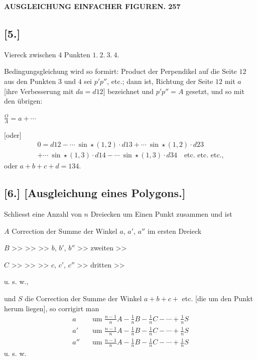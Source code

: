 \documentclass[12pt,a4paper]{article}
\theoremstyle{plain}
\theoremstyle{definition}
\theoremstyle{remark}
\begin{document}
\newpage

\noindent\textbf{AUSGLEICHUNG EINFACHER FIGUREN. 257}

\subsection*{[5.]}

Viereck zwischen 4 Punkten $1.\ 2.\ 3.\ 4$.

Bedingungsgleichung wird so formirt: Product der Perpendikel auf die
Seite $12$ aus den Punkten $3$ und $4$ sei $p'p''$, etc.; dann ist, Richtung der
Seite $12$ mit $a$ [ihre Verbesserung mit $da = d12$] bezeichnet und $p'p'' = A$
gesetzt, und so mit den \"ubrigen:

$\displaystyle\frac{O}{A} = a + \cdots$

[oder]
\begin{multline*}
0 = d12 - \cdots\ \sin \star(1,2) \cdot d13 + \cdots\ \sin \star(1,2) \cdot d23 \\
+ \cdots\ \sin \star(1,3) \cdot d14 - \cdots\ \sin \star(1,3) \cdot d34 \quad\text{etc. etc. etc.,}
\end{multline*}
oder $a + b + c + d = 134$.

\subsection*{[6.] [Ausgleichung eines Polygons.]}

Schliesst eine Anzahl von $n$ Dreiecken um Einen Punkt zusammen
und ist

$A$ Correction der Summe der Winkel $a$, $a'$, $a''$ im ersten Dreieck

$B$ \quad >> \quad >> \quad >> \quad $b$, $b'$, $b''$ \quad >> zweiten >>

$C$ \quad >> \quad >> \quad >> \quad $c$, $c'$, $c''$ \quad >> dritten >>

u. s. w.,

und $S$ die Correction der Summe der Winkel $a + b + c +$ etc. [die um den
Punkt herum liegen], so corrigirt man
\begin{align*}
a &\quad\text{um } \frac{n-1}{n}A - \frac{1}{n}B - \frac{1}{n}C - \cdots + \frac{1}{n}S \\
a' &\quad\text{um } \frac{n-1}{n}A - \frac{1}{n}B - \frac{1}{n}C - \cdots + \frac{1}{n}S \\
a'' &\quad\text{um } \frac{n-1}{n}A - \frac{1}{n}B - \frac{1}{n}C - \cdots + \frac{1}{n}S
\end{align*}
u. s. w.
\end{document}
